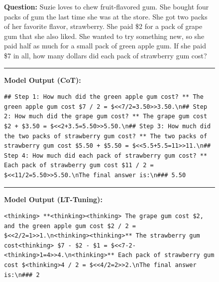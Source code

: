 \documentclass{article}
\theoremstyle{plain}
\theoremstyle{definition}
\theoremstyle{remark}
\begin{document}
\begin{figure}[h]
\centering
\begin{tcolorbox}[colback=blue!5, colframe=blue!50, title=Example 3]
\textbf{Question:} Suzie loves to chew fruit-flavored gum. She bought four packs of gum the last time she was at the store. She got two packs of her favorite flavor, strawberry. She paid \$2 for a pack of grape gum that she also liked. She wanted to try something new, so she paid half as much for a small pack of green apple gum. If she paid \$7 in all, how many dollars did each pack of strawberry gum cost?

\rule{\linewidth}{0.7pt}

\textbf{Model Output (CoT):}

\begin{lstlisting}
## Step 1: How much did the green apple gum cost? ** The green apple gum cost $7 / 2 = $<<7/2=3.50>>3.50.\n## Step 2: How much did the grape gum cost? ** The grape gum cost $2 + $3.50 = $<<2+3.5=5.50>>5.50.\n## Step 3: How much did the two packs of strawberry gum cost? ** The two packs of strawberry gum cost $5.50 + $5.50 = $<<5.5+5.5=11>>11.\n## Step 4: How much did each pack of strawberry gum cost? ** Each pack of strawberry gum cost $11 / 2 = $<<11/2=5.50>>5.50.\nThe final answer is:\n### 5.50
\end{lstlisting}
\rule{\linewidth}{0.7pt}
\textbf{Model Output (LT-Tuning):}
\begin{lstlisting}
<thinking> **<thinking><thinking> The grape gum cost $2, and the green apple gum cost $2 / 2 = $<<2/2=1>>1.\n<thinking><thinking>** The strawberry gum cost<thinking> $7 - $2 - $1 = $<<7-2-<thinking>1=4>>4.\n<thinking>** Each pack of strawberry gum cost $<thinking>4 / 2 = $<<4/2=2>>2.\nThe final answer is:\n### 2
\end{lstlisting}
\end{tcolorbox}
\label{fig:example3}
\end{figure}

\end{document}
